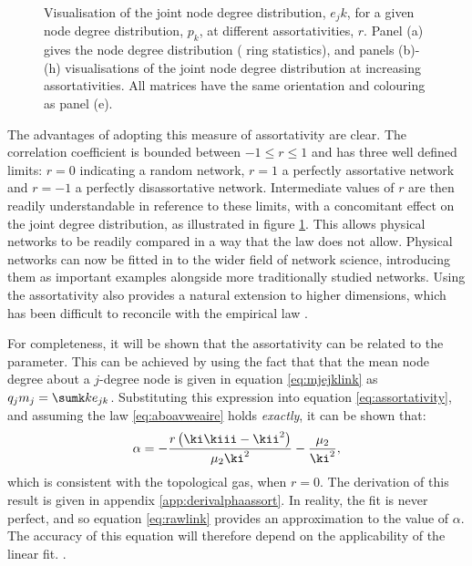 \begin{figure}[bt]
     \caption{Visualisation of the joint node degree distribution, $e_jk$, for a given node degree distribution, $p_k$, at different assortativities, $r$. Panel (a) gives the node degree distribution (\ie{} ring statistics), and panels (b)\--(h) visualisations of the joint node degree distribution at increasing assortativities. All matrices have the same orientation and colouring as panel (e).}
     \label{fig:rex}
\end{figure}

The advantages of adopting this measure of assortativity are clear.
The correlation coefficient is bounded between $-1\leq r \leq 1$ and has three well defined limits: $r=0$ indicating a random network, $r=1$ a perfectly assortative network and $r=-1$ a perfectly disassortative network.
Intermediate values of $r$ are then readily understandable in reference to these limits, with a concomitant effect on the joint degree distribution, as illustrated in figure \ref{fig:rex}. 
This allows physical networks to be readily compared in a way that the \aw{} law does not allow.
Physical networks can now be fitted in to the wider field of network science, introducing them as important examples alongside more traditionally studied networks.
Using the assortativity also provides a natural extension to higher dimensions, which has been difficult to reconcile with the empirical \aw{} law \cite{Mason2012}.

For completeness, it will be shown that the assortativity can be related to the \aw{} parameter.
This can be achieved by using the fact that that the mean node degree about a $j$-degree node is given in equation \eqref{eq:mjejklink} as $q_jm_j=\sumk ke_{jk}$.
Substituting this expression into equation \eqref{eq:assortativity}, and assuming the \aw{} law \eqref{eq:aboavweaire} holds \textit{exactly}, it can be shown that:
\begin{equation}
        \label{eq:rawlink}
        \alpha = - \frac{r\left(\ki\kiii-\kii^2\right)}{\mu_2\ki^2}-\frac{\mu_2}{\ki^2},
\end{equation}
which is consistent with the topological gas, when $r=0$.
The derivation of this result is given in appendix \ref{app:derivalphaassort}.
In reality, the \aw{} fit is never perfect, and so equation \eqref{eq:rawlink} provides an approximation to the value of $\alpha$. 
The accuracy of this equation will therefore depend on the applicability of the linear fit.
.

